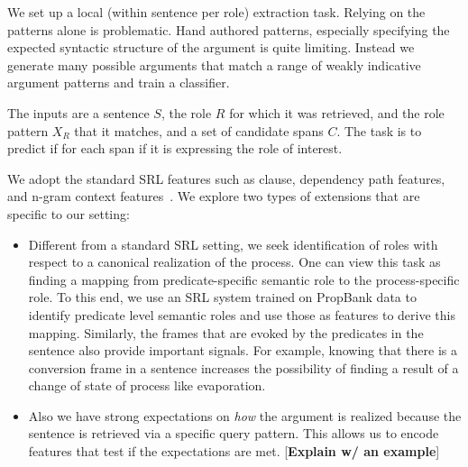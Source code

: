 We set up a local (within sentence per role) extraction task. Relying on the patterns alone is problematic. Hand authored patterns, especially specifying the expected syntactic structure of the argument is quite limiting. Instead we generate many possible arguments that match a range of weakly indicative argument patterns and train a classifier. 

The inputs are a sentence $S$, the role $R$ for which it was retrieved, and the role pattern $X_R$ that it matches, and a set of candidate spans $C$.
The task is to predict if for each span if it is expressing the role of interest. 

We adopt the standard SRL features such as clause, dependency path features, and n-gram context features~\cite{gildea2002automatic,koomen2005generalized}. 
We explore two types of extensions that are specific to our setting:
\begin{itemize}

\item Different from a standard SRL setting, we seek identification of roles with respect to a canonical realization of the process. 
One can view this task as finding a mapping from predicate-specific semantic role to the process-specific role. 
To this end, we use an SRL system trained on PropBank data to identify predicate level semantic roles and use those as features to derive this mapping.
Similarly, the frames that are evoked by the predicates in the sentence also provide important signals. For example, knowing that there is a conversion 
frame in a sentence increases the possibility of finding a result of a change of state of process like evaporation. 

\item Also we have strong expectations on {\em how} the argument is realized because the sentence is retrieved via a specific query pattern.
This allows us to encode features that test if the expectations are met. [{\bf Explain w/ an example}]

\end{itemize}



